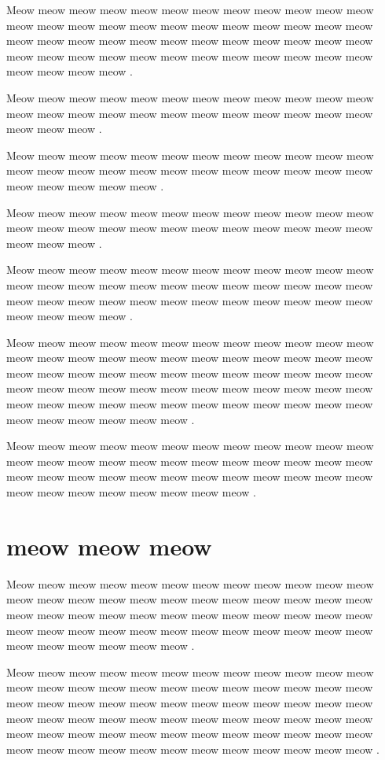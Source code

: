 \documentclass[12pt, a5paper, openany]{book}
\begin{document}
Meow meow meow meow meow meow meow meow meow meow meow meow meow meow meow meow meow meow meow meow meow meow meow meow meow meow meow meow meow meow meow meow meow meow meow meow meow meow meow meow meow meow meow meow meow meow meow meow meow meow meow meow .

Meow meow meow meow meow meow meow meow meow meow meow meow meow meow meow meow meow meow meow meow meow meow meow meow meow meow meow .

Meow meow meow meow meow meow meow meow meow meow meow meow meow meow meow meow meow meow meow meow meow meow meow meow meow meow meow meow meow .

Meow meow meow meow meow meow meow meow meow meow meow meow meow meow meow meow meow meow meow meow meow meow meow meow meow meow meow .

Meow meow meow meow meow meow meow meow meow meow meow meow meow meow meow meow meow meow meow meow meow meow meow meow meow meow meow meow meow meow meow meow meow meow meow meow meow meow meow meow .

Meow meow meow meow meow meow meow meow meow meow meow meow meow meow meow meow meow meow meow meow meow meow meow meow meow meow meow meow meow meow meow meow meow meow meow meow meow meow meow meow meow meow meow meow meow meow meow meow meow meow meow meow meow meow meow meow meow meow meow meow meow meow meow meow meow meow .

Meow meow meow meow meow meow meow meow meow meow meow meow meow meow meow meow meow meow meow meow meow meow meow meow meow meow meow meow meow meow meow meow meow meow meow meow meow meow meow meow meow meow meow meow .



\chapter{meow meow meow }Meow meow meow meow meow meow meow meow meow meow meow meow meow meow meow meow meow meow meow meow meow meow meow meow meow meow meow meow meow meow meow meow meow meow meow meow meow meow meow meow meow meow meow meow meow meow meow meow meow meow meow meow meow meow .

Meow meow meow meow meow meow meow meow meow meow meow meow meow meow meow meow meow meow meow meow meow meow meow meow meow meow meow meow meow meow meow meow meow meow meow meow meow meow meow meow meow meow meow meow meow meow meow meow meow meow meow meow meow meow meow meow meow meow meow meow meow meow meow meow meow meow meow meow meow meow meow meow .
\end{document}
